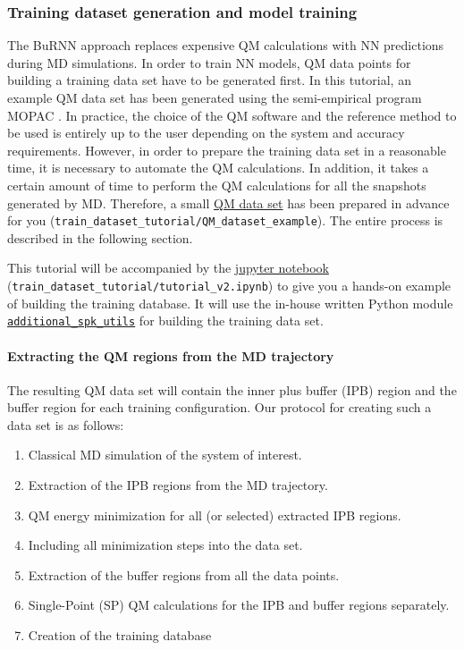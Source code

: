 \subsubsection{Training dataset generation and model training}
The BuRNN approach replaces expensive QM calculations with NN predictions during MD simulations. In order to train NN models, QM data points for building a training data set have to be generated first. In this tutorial, an example QM data set has been generated using the semi-empirical program MOPAC \cite{Stewart1990MOPAC, Stewart2013MOPAC}. In practice, the choice of the QM software and the reference method to be used is entirely up to the user depending on the system and accuracy requirements. However, in order to prepare the training data set in a reasonable time, it is necessary to automate the QM calculations. In addition, it takes a certain amount of time to perform the QM calculations for all the snapshots generated by MD. Therefore, a small \href{https://github.com/LierB/gromos_tutorial_livecoms/tree/burnn_tutorial_rc/tutorial_files/t_06/train_dataset_tutorial/QM_dataset_example}{QM data set} has been prepared in advance for you (\texttt{train\_dataset\_tutorial/QM\_dataset\_example}). The entire process is described in the following section.


This tutorial will be accompanied by the \href{https://github.com/LierB/gromos_tutorial_livecoms/blob/burnn_tutorial_rc/tutorial_files/t_06/train_dataset_tutorial/tutorial_v2.ipynb}{jupyter notebook} (\texttt{train\_dataset\_tutorial/tutorial\_v2.ipynb}) to give you a hands-on example of building the training database. It will use the in-house written Python module \href{https://github.com/LierB/gromos_tutorial_livecoms/blob/burnn_tutorial_rc/tutorial_files/t_06/train_dataset_tutorial/additional_spk_utils.py}{\texttt{additional\_spk\_utils}} for building the training data set.


\paragraph{Extracting the QM regions from the MD trajectory}
The resulting QM data set will contain the inner plus buffer (IPB) region and the buffer region for each training configuration. Our protocol for creating such a data set is as follows: 
\begin{enumerate}
    \item Classical MD simulation of the system of interest.
    \item Extraction of the IPB regions from the MD trajectory.
    \item QM energy minimization for all (or selected) extracted IPB regions.
    \item Including all minimization steps into the data set.
    \item Extraction of the buffer regions from all the data points.
    \item Single-Point (SP) QM calculations for the IPB and buffer regions separately.
    \item Creation of the training database
\end{enumerate}

